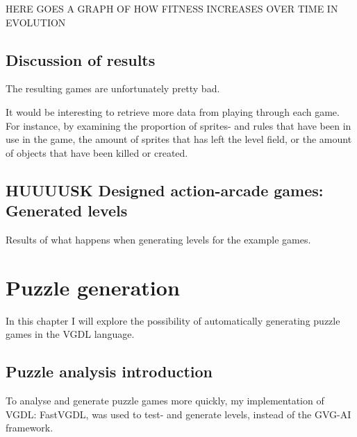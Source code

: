 \documentclass[a4paper,titlepage,final]{report}
\begin{document}
HERE GOES A GRAPH OF HOW FITNESS INCREASES OVER TIME IN EVOLUTION



\section{Discussion of results}
\label{sec_task2discussion}
The resulting games are unfortunately pretty bad.

It would be interesting to retrieve more data from playing through each game.
For instance, by examining the proportion of sprites- and rules that have been in use in the game, the amount of sprites that has left the level field, or the amount of objects that have been killed or created.




\section{HUUUUSK Designed action-arcade games: Generated levels}
Results of what happens when generating levels for the example games.


\chapter{Puzzle generation}
\label{ch_task3}
In this chapter I will explore the possibility of automatically generating puzzle games in the VGDL language.

\section{Puzzle analysis introduction}
\label{sec_task3intro}
To analyse and generate puzzle games more quickly, my implementation of VGDL: FastVGDL, was used to test- and generate levels, instead of the GVG-AI framework.
\end{document}
